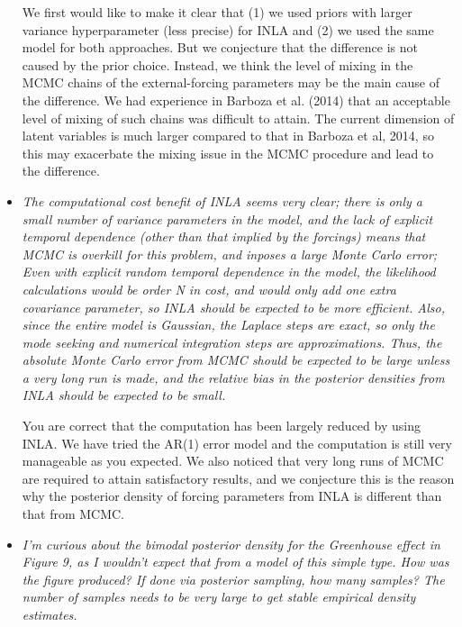 \documentclass[11pt]{article}
\newcommand{\lb}[1]{\color{ForestGreen}\textbf{[Luis B.: #1]}\normalcolor}
\newcommand{\bl}[1]{\color{red}\textbf{[Bo: #1]}\normalcolor}
\begin{document}
\begin{itemize}
We first would like to make it clear that  (1) we used priors with larger
variance hyperparameter (less precise) for INLA and (2) we used
the same model for both approaches.  But we conjecture that the difference is not caused by the prior choice. Instead, we think the level of mixing in the MCMC chains of the external-forcing parameters may be the main cause of the difference. We had experience in Barboza et al. (2014) that an acceptable level of mixing of such chains was difficult to attain. The current
dimension of latent variables is much larger compared to that in Barboza et al,
2014, so this may exacerbate the mixing issue in the MCMC procedure and lead to
the difference. 


\item \textit{The computational cost benefit of INLA seems very clear; there is
  only a small number of variance parameters in the model, and the
  lack of explicit temporal dependence (other than that implied by the
  forcings) means that MCMC is overkill for this problem, and inposes
  a large Monte Carlo error; Even with explicit random temporal
  dependence in the model, the likelihood calculations would be order
  N in cost, and would only add one extra covariance parameter, so
  INLA should be expected to be more efficient.  Also, since the
  entire model is Gaussian, the Laplace steps are exact, so only the
  mode seeking and numerical integration steps are approximations.
  Thus, the absolute Monte Carlo error from MCMC should be expected to
  be large unless a very long run is made, and the relative bias in
  the posterior densities from INLA should be expected to be small.}

You are correct that the computation has been largely reduced by using INLA. We have tried the AR(1) error model and the computation is still very manageable as you expected.  We also noticed that very long runs of MCMC are required to attain satisfactory results, and we conjecture this is the reason why the posterior density of forcing parameters from INLA is different than that from MCMC.


\item \textit{I'm curious about the bimodal posterior density for the Greenhouse
  effect in Figure 9, as I wouldn't expect that from a model of this
  simple type.  How was the figure produced? If done via posterior
  sampling, how many samples? The number of samples needs to be very
  large to get stable empirical density estimates.}


\end{itemize}
\end{document}

